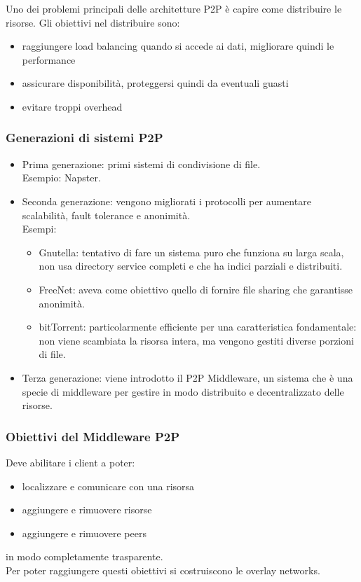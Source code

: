 Uno dei problemi principali delle architetture P2P è capire come distribuire le risorse. Gli obiettivi nel distribuire sono:
\begin{itemize}
    \item raggiungere load balancing quando si accede ai dati, migliorare quindi le performance
    \item assicurare disponibilità, proteggersi quindi da eventuali guasti
    \item evitare troppi overhead
\end{itemize}

\subsubsection{Generazioni di sistemi P2P}
\begin{itemize}
    \item Prima generazione: primi sistemi di condivisione di file. \\
    Esempio: Napster.
    \item Seconda generazione: vengono migliorati i protocolli per aumentare scalabilità, fault tolerance e anonimità. \\
    Esempi: 
    \begin{itemize}
        \item Gnutella: tentativo di fare un sistema puro che funziona su larga scala, non usa directory service completi e che ha indici parziali e distribuiti.
        \item FreeNet: aveva come obiettivo quello di fornire file sharing che garantisse anonimità.
        \item bitTorrent: particolarmente efficiente per una caratteristica fondamentale: non viene scambiata la risorsa intera, ma vengono gestiti diverse porzioni di file.
    \end{itemize}
    \item Terza generazione: viene introdotto il P2P Middleware, un sistema che è una specie di middleware per gestire in modo distribuito e decentralizzato delle risorse.
\end{itemize}

\subsubsection{Obiettivi del Middleware P2P}
Deve abilitare i client a poter:
\begin{itemize}
    \item localizzare e comunicare con una risorsa
    \item aggiungere e rimuovere risorse
    \item aggiungere e rimuovere peers
\end{itemize}
in modo completamente trasparente.\\
Per poter raggiungere questi obiettivi si costruiscono le overlay networks.


